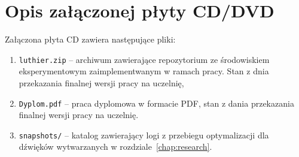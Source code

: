 \chapter{Opis załączonej płyty CD/DVD}\label{chap:opis-plyty}


Załączona płyta CD zawiera następujące pliki:

\begin{enumerate}
  \item \texttt{luthier.zip} -- archiwum zawierające repozytorium ze
    środowiskiem eksperymentowym zaimplementwanym w ramach pracy.
    Stan z dnia przekazania finalnej wersji pracy na uczelnię,
  \item \texttt{Dyplom.pdf} -- praca dyplomowa w formacie PDF,
    stan z dania przekazania finalnej wersji pracy na uczelnię.
  \item \texttt{snapshots/} -- katalog zawierający logi z przebiegu optymalizacji
    dla dźwięków wytwarzanych w rozdziale~\ref{chap:research}.
\end{enumerate}

